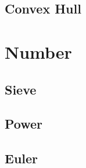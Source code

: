 \subsection{Convex Hull}

\section{Number}

\subsection{Sieve}


\subsection{Power}


\subsection{Euler}

